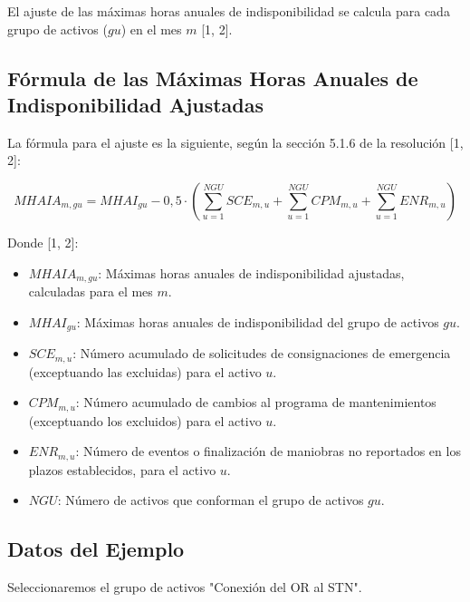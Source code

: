 \documentclass[a5paper]{book}%
\begin{document}
El ajuste de las máximas horas anuales de indisponibilidad se calcula para cada grupo de activos ($gu$) en el mes $m$ [1, 2].

\subsection*{Fórmula de las Máximas Horas Anuales de Indisponibilidad Ajustadas}

La fórmula para el ajuste es la siguiente, según la sección 5.1.6 de la resolución [1, 2]:

\begin{equation}
	\label{eq:mhaia}
	MHAI A_{m, gu} = MHAI_{gu} - 0,5 \cdot \left( \sum_{u=1}^{NGU} SCE_{m, u} + \sum_{u=1}^{NGU} CPM_{m, u} + \sum_{u=1}^{NGU} ENR_{m, u} \right)
\end{equation}

Donde [1, 2]:
\begin{itemize}
	\item $MHAI A_{m, gu}$: Máximas horas anuales de indisponibilidad ajustadas, calculadas para el mes $m$.
	\item $MHAI_{gu}$: Máximas horas anuales de indisponibilidad del grupo de activos $gu$.
	\item $SCE_{m, u}$: Número acumulado de solicitudes de consignaciones de emergencia (exceptuando las excluidas) para el activo $u$.
	\item $CPM_{m, u}$: Número acumulado de cambios al programa de mantenimientos (exceptuando los excluidos) para el activo $u$.
	\item $ENR_{m, u}$: Número de eventos o finalización de maniobras no reportados en los plazos establecidos, para el activo $u$.
	\item $NGU$: Número de activos que conforman el grupo de activos $gu$.
\end{itemize}

\subsection*{Datos del Ejemplo}

Seleccionaremos el grupo de activos "Conexión del OR al STN".
\end{document}
